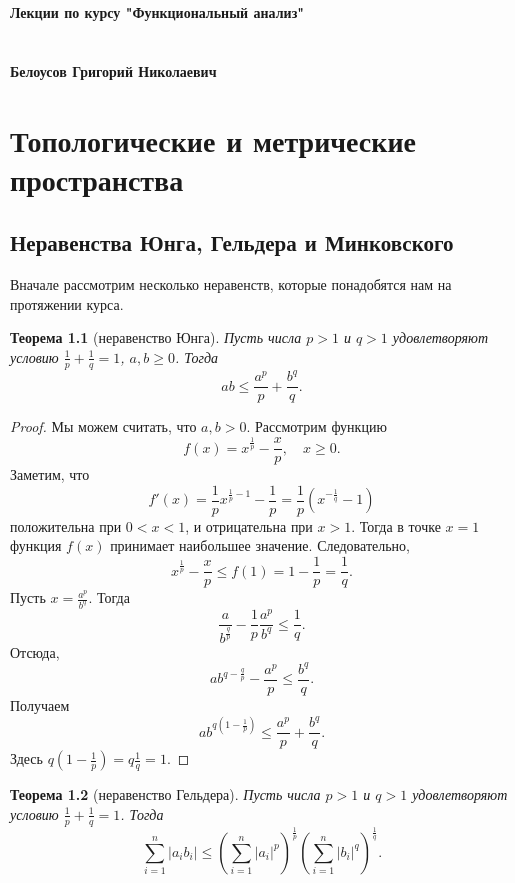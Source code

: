 \documentclass[12pt, titlepage, oneside]{amsbook}
\date{}
\newtheorem{theorem}{Теорема}[chapter]
\theoremstyle{definition}
\theoremstyle{remark}
\begin{document}
\begin{titlepage}
	\begin{center}
		\large{\textbf{Лекции по курсу "Функциональный анализ"}} \quad \\
		\quad
		\\ \quad
		\\ \quad
		\large{\textbf{Белоусов Григорий Николаевич}} \quad \\ \quad
		
	\end{center}
\end{titlepage}

\tableofcontents

\chapter{Топологические и метрические пространства}

\section{Неравенства Юнга, Гельдера и Минковского}

Вначале рассмотрим несколько неравенств, которые понадобятся нам на протяжении курса.

\begin{theorem}[неравенство Юнга]
	\label{NerUng}
	Пусть числа $p>1$ и $q>1$ удовлетворяют условию $\frac{1}{p}+\frac{1}{q}=1$, $a,b\geq 0$. Тогда $$ab\leq\frac{a^p}{p}+\frac{b^q}{q}.$$
\end{theorem}

\begin{proof}
	Мы можем считать, что $a,b>0$. Рассмотрим функцию $$f(x)=x^{\frac{1}{p}}-\frac{x}{p},\quad x\geq 0.$$ Заметим, что $$f'(x)=\frac{1}{p}x^{\frac{1}{p}-1}-\frac{1}{p}=\frac{1}{p}\left(x^{-\frac{1}{q}}-1\right)$$ положительна при $0<x<1$, и отрицательна при $x>1$. Тогда в точке $x=1$ функция $f(x)$ принимает наибольшее значение. Следовательно, $$x^{\frac{1}{p}}-\frac{x}{p}\leq f(1)=1-\frac{1}{p}=\frac{1}{q}.$$ Пусть $x=\frac{a^p}{b^q}$. Тогда $$\frac{a}{b^{\frac{q}{p}}}-\frac{1}{p}\frac{a^p}{b^q}\leq\frac{1}{q}.$$ Отсюда, $$ab^{q-\frac{q}{p}}-\frac{a^p}{p}\leq\frac{b^q}{q}.$$ Получаем $$ab^{q(1-\frac{1}{p})}\leq\frac{a^p}{p}+\frac{b^q}{q}.$$ Здесь $q(1-\frac{1}{p})=q\frac{1}{q}=1$.
\end{proof}

\begin{theorem}[неравенство Гельдера]
	\label{NerGed}
	Пусть числа $p>1$ и $q>1$ удовлетворяют условию $\frac{1}{p}+\frac{1}{q}=1$. Тогда $$\sum\limits_{i=1}^n |a_i b_i|\leq\left(\sum\limits_{i=1}^n |a_i|^p\right)^{\frac{1}{p}}\left(\sum\limits_{i=1}^n |b_i|^q\right)^{\frac{1}{q}}.$$
\end{theorem}
\end{document}
